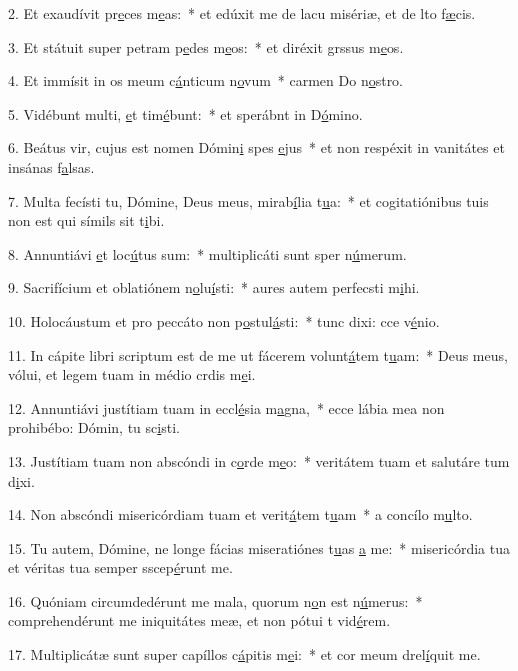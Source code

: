 2. Et exaudívit pr\uline{e}ces m\uline{e}as:~* et edúxit me de lacu misériæ, et de lto f\uline{æ}cis.\par 
3. Et státuit super petram p\uline{e}des m\uline{e}os:~* et diréxit grssus m\uline{e}os.\par 
4. Et immísit in os meum c\uline{á}nticum n\uline{o}vum~* carmen Do n\uline{o}stro.\par 
5. Vidébunt multi, \uline{e}t tim\uline{é}bunt:~* et sperábnt in D\uline{ó}mino.\par 
6. Beátus vir, cujus est nomen Dómin\uline{i} spes \uline{e}jus~* et non respéxit in vanitátes et insánas f\uline{a}lsas.\par 
7. Multa fecísti tu, Dómine, Deus meus, mirab\uline{í}lia t\uline{u}a:~* et cogitatiónibus tuis non est qui símils sit t\uline{i}bi.\par 
8. Annuntiávi \uline{e}t loc\uline{ú}tus sum:~* multiplicáti sunt sper n\uline{ú}merum.\par 
9. Sacrifícium et oblatiónem n\uline{o}lu\uline{í}sti:~* aures autem perfecsti m\uline{i}hi.\par 
10. Holocáustum et pro peccáto non p\uline{o}stul\uline{á}sti:~* tunc dixi: cce v\uline{é}nio.\par 
11. In cápite libri scriptum est de me ut fácerem volunt\uline{á}tem t\uline{u}am:~* Deus meus, vólui, et legem tuam in médio crdis m\uline{e}i.\par 
12. Annuntiávi justítiam tuam in eccl\uline{é}sia m\uline{a}gna,~* ecce lábia mea non prohibébo: Dómin, tu sc\uline{i}sti.\par 
13. Justítiam tuam non abscóndi in c\uline{o}rde m\uline{e}o:~* veritátem tuam et salutáre tum d\uline{i}xi.\par 
14. Non abscóndi misericórdiam tuam et verit\uline{á}tem t\uline{u}am~* a concílo m\uline{u}lto.\par 
15. Tu autem, Dómine, ne longe fácias miseratiónes t\uline{u}as \uline{a} me:~* misericórdia tua et véritas tua semper sscep\uline{é}runt me.\par 
16. Quóniam circumdedérunt me mala, quorum n\uline{o}n est n\uline{ú}merus:~* comprehendérunt me iniquitátes meæ, et non pótui t vid\uline{é}rem.\par 
17. Multiplicátæ sunt super capíllos c\uline{á}pitis m\uline{e}i:~* et cor meum drel\uline{í}quit me.\par 
